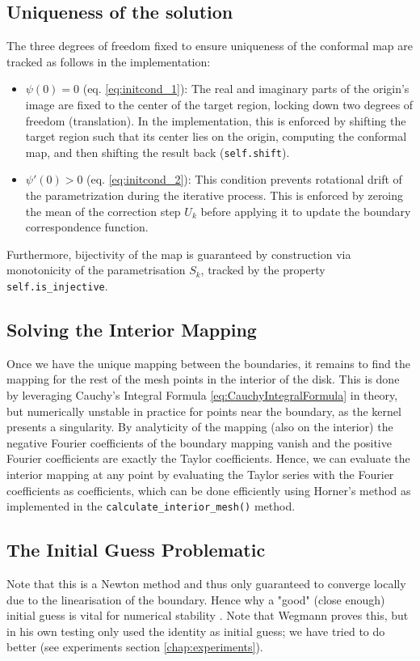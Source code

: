 \subsection{Uniqueness of the solution}
The three degrees of freedom fixed to ensure uniqueness of the conformal map are tracked as follows in the implementation:
\begin{itemize}
    \item $\psi(0) = 0$ (eq. \ref{eq:initcond_1}): The real and imaginary parts of the origin's image are fixed to the center of the target region, locking down two degrees of freedom (translation). In the implementation, this is enforced by shifting the target region such that its center lies on the origin, computing the conformal map, and then shifting the result back (\texttt{self.shift}).
    \item $\psi'(0) > 0$ (eq. \ref{eq:initcond_2}): This condition prevents rotational drift of the parametrization during the iterative process. This is enforced by zeroing the mean of the correction step $U_k$ before applying it to update the boundary correspondence function.
\end{itemize}
Furthermore, bijectivity of the map is guaranteed by construction via monotonicity of the parametrisation $S_k$, tracked by the property \texttt{self.is\_injective}.

\subsection{Solving the Interior Mapping}
Once we have the unique mapping between the boundaries, it remains to find the mapping for the rest of the mesh points in the interior of the disk. This is done by leveraging Cauchy's Integral Formula \ref{eq:CauchyIntegralFormula} in theory, but numerically unstable in practice for points near the boundary, as the kernel presents a singularity. 
By analyticity of the mapping (also on the interior) the negative Fourier coefficients of the boundary mapping vanish and the positive Fourier coefficients are exactly the Taylor coefficients. Hence, we can evaluate the interior mapping at any point by evaluating the Taylor series with the Fourier coefficients as coefficients, which can be done efficiently using Horner's method \cite{Burrus2003horner} as implemented in the \texttt{calculate\_interior\_mesh()} method.


\subsection{The Initial Guess Problematic}
Note that this is a Newton method and thus only guaranteed to converge locally due to the linearisation of the boundary. Hence why a "good" (close enough) initial guess is vital for numerical stability \cite[Thm. 5]{Wegmann1978_newtonverfahren}. 
Note that Wegmann proves this, but in his own testing only used the identity as initial guess; we have tried to do better (see experiments section \ref{chap:experiments}).

